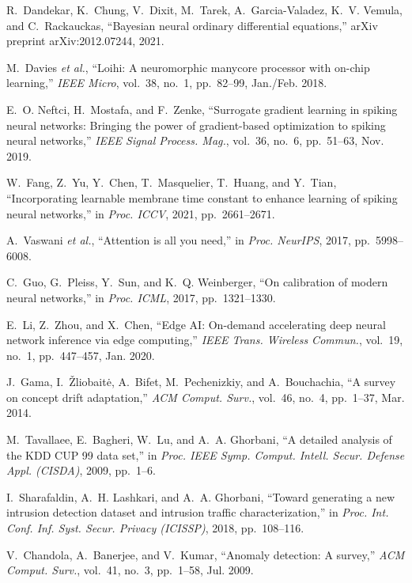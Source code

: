 \documentclass[10pt,journal,compsoc]{IEEEtran}
\begin{document}
\begin{thebibliography}{99}
R.~Dandekar, K.~Chung, V.~Dixit, M.~Tarek, A.~Garcia-Valadez, K.~V. Vemula, and C.~Rackauckas, ``Bayesian neural ordinary differential equations,'' arXiv preprint arXiv:2012.07244, 2021.

M.~Davies \emph{et al.}, ``Loihi: A neuromorphic manycore processor with on-chip learning,'' \emph{IEEE Micro}, vol.~38, no.~1, pp.~82--99, Jan./Feb. 2018.

E.~O. Neftci, H.~Mostafa, and F.~Zenke, ``Surrogate gradient learning in spiking neural networks: Bringing the power of gradient-based optimization to spiking neural networks,'' \emph{IEEE Signal Process. Mag.}, vol.~36, no.~6, pp.~51--63, Nov. 2019.

W.~Fang, Z.~Yu, Y.~Chen, T.~Masquelier, T.~Huang, and Y.~Tian, ``Incorporating learnable membrane time constant to enhance learning of spiking neural networks,'' in \emph{Proc. ICCV}, 2021, pp.~2661--2671.

A.~Vaswani \emph{et al.}, ``Attention is all you need,'' in \emph{Proc. NeurIPS}, 2017, pp.~5998--6008.

C.~Guo, G.~Pleiss, Y.~Sun, and K.~Q. Weinberger, ``On calibration of modern neural networks,'' in \emph{Proc. ICML}, 2017, pp.~1321--1330.

E.~Li, Z.~Zhou, and X.~Chen, ``Edge AI: On-demand accelerating deep neural network inference via edge computing,'' \emph{IEEE Trans. Wireless Commun.}, vol.~19, no.~1, pp.~447--457, Jan. 2020.

J.~Gama, I.~Žliobaitė, A.~Bifet, M.~Pechenizkiy, and A.~Bouchachia, ``A survey on concept drift adaptation,'' \emph{ACM Comput. Surv.}, vol.~46, no.~4, pp.~1--37, Mar. 2014.

M.~Tavallaee, E.~Bagheri, W.~Lu, and A.~A. Ghorbani, ``A detailed analysis of the KDD CUP 99 data set,'' in \emph{Proc. IEEE Symp. Comput. Intell. Secur. Defense Appl. (CISDA)}, 2009, pp.~1--6.

I.~Sharafaldin, A.~H. Lashkari, and A.~A. Ghorbani, ``Toward generating a new intrusion detection dataset and intrusion traffic characterization,'' in \emph{Proc. Int. Conf. Inf. Syst. Secur. Privacy (ICISSP)}, 2018, pp.~108--116.

V.~Chandola, A.~Banerjee, and V.~Kumar, ``Anomaly detection: A survey,'' \emph{ACM Comput. Surv.}, vol.~41, no.~3, pp.~1--58, Jul. 2009.


\end{thebibliography}
\end{document}
